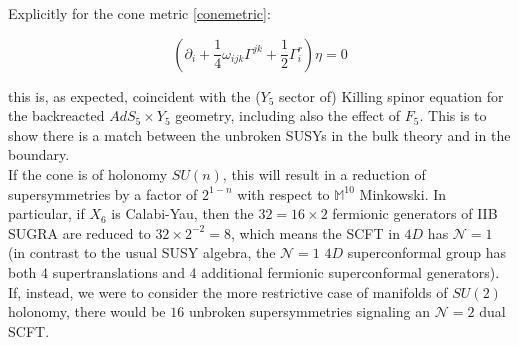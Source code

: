 Explicitly for the cone metric \ref{conemetric}:

\begin{equation}
	\left(\partial_i + \frac{1}{4} \omega_{ijk} \Gamma^{jk} + \frac{1}{2} \Gamma^r_i \right) \eta = 0
\end{equation}

this is, as expected, coincident with the ($Y_5$ sector of) Killing spinor equation for the backreacted $AdS_5 \times Y_5$ geometry, including also the effect of $F_5$. This is to show there is a match between the unbroken SUSYs in the bulk theory and in the boundary.\\

If the cone is of holonomy $SU(n)$, this will result in a reduction of supersymmetries by a factor of $2^{1-n}$ with respect to $\mathbb{M}^{10}$ Minkowski. In particular, if $X_6$ is Calabi-Yau, then the $32 = 16 \times 2$ fermionic generators of IIB SUGRA are reduced to $32 \times 2^{-2} = 8$, which means the SCFT in $4D$ has $\mathcal{N}=1$ (in contrast to the usual SUSY algebra, the $\mathcal{N}=1$ $4D$ superconformal group has both $4$ supertranslations and $4$ additional fermionic superconformal generators). If, instead, we were to consider the more restrictive case of manifolds of $SU(2)$ holonomy, there would be $16$ unbroken supersymmetries signaling an $\mathcal{N}=2$ dual SCFT.

%
%
%
%
%
%
%
%
%
%
